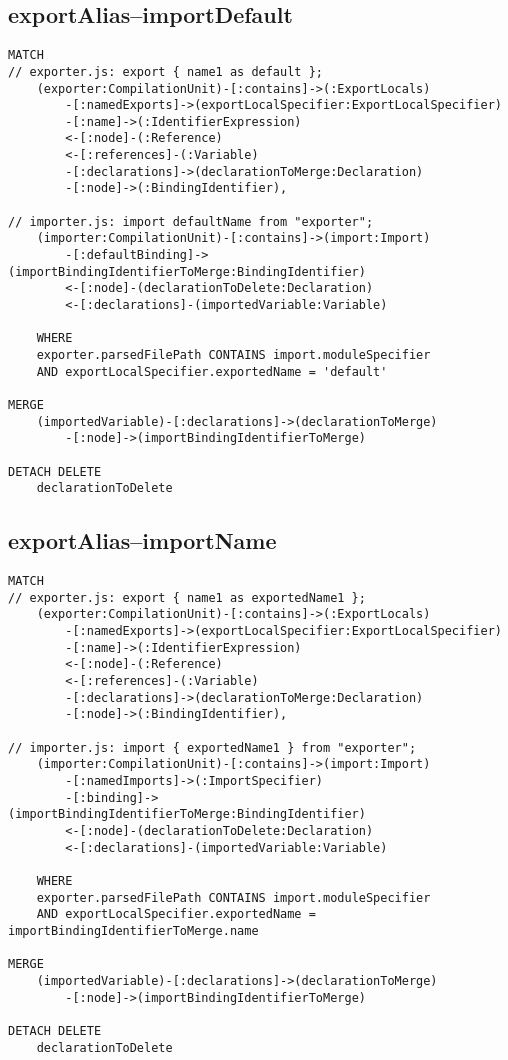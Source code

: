 \subsection{exportAlias–importDefault}
\begin{lstlisting}[language=Cypher]
MATCH
// exporter.js: export { name1 as default };
    (exporter:CompilationUnit)-[:contains]->(:ExportLocals)
        -[:namedExports]->(exportLocalSpecifier:ExportLocalSpecifier)
        -[:name]->(:IdentifierExpression)
        <-[:node]-(:Reference)
        <-[:references]-(:Variable)
        -[:declarations]->(declarationToMerge:Declaration)
        -[:node]->(:BindingIdentifier),

// importer.js: import defaultName from "exporter";
    (importer:CompilationUnit)-[:contains]->(import:Import)
        -[:defaultBinding]->(importBindingIdentifierToMerge:BindingIdentifier)
        <-[:node]-(declarationToDelete:Declaration)
        <-[:declarations]-(importedVariable:Variable)

    WHERE
    exporter.parsedFilePath CONTAINS import.moduleSpecifier
    AND exportLocalSpecifier.exportedName = 'default'

MERGE
    (importedVariable)-[:declarations]->(declarationToMerge)
        -[:node]->(importBindingIdentifierToMerge)

DETACH DELETE
    declarationToDelete
\end{lstlisting}


\newpage
\subsection{exportAlias–importName}
\begin{lstlisting}[language=Cypher]
MATCH
// exporter.js: export { name1 as exportedName1 };
    (exporter:CompilationUnit)-[:contains]->(:ExportLocals)
        -[:namedExports]->(exportLocalSpecifier:ExportLocalSpecifier)
        -[:name]->(:IdentifierExpression)
        <-[:node]-(:Reference)
        <-[:references]-(:Variable)
        -[:declarations]->(declarationToMerge:Declaration)
        -[:node]->(:BindingIdentifier),

// importer.js: import { exportedName1 } from "exporter";
    (importer:CompilationUnit)-[:contains]->(import:Import)
        -[:namedImports]->(:ImportSpecifier)
        -[:binding]->(importBindingIdentifierToMerge:BindingIdentifier)
        <-[:node]-(declarationToDelete:Declaration)
        <-[:declarations]-(importedVariable:Variable)

    WHERE
    exporter.parsedFilePath CONTAINS import.moduleSpecifier
    AND exportLocalSpecifier.exportedName = importBindingIdentifierToMerge.name

MERGE
    (importedVariable)-[:declarations]->(declarationToMerge)
        -[:node]->(importBindingIdentifierToMerge)

DETACH DELETE
    declarationToDelete
\end{lstlisting}



